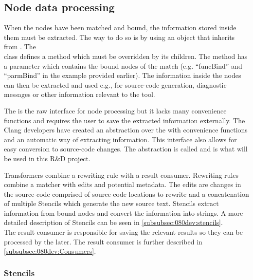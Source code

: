 \subsection{Node data processing} \label{subsec:080dev:NodeDataProcessing}

When the nodes have been matched and bound, the information stored inside them must be extracted. The way to do so is by using an object that inherits from .
The \\ class defines a  method which must be overridden by its children. The  method has a  parameter which contains the bound nodes of the match (e.g. ``funcBind'' and ``parmBind'' in the example provided earlier).
The information inside the nodes can then be extracted and used e.g., for source-code generation, diagnostic messages or other information relevant to the tool.

The  is the raw interface for node processing but it lacks many convenience functions and requires the user to save the extracted information externally. The Clang developers have created an abstraction over the  with convenience functions and an automatic way of extracting information. This interface also allows for easy conversion to source-code changes. The abstraction is called  and is what will be used in this R\&D project.

Transformers combine a rewriting rule with a result consumer. Rewriting rules combine a matcher with edits and potential metadata. The edits are changes in the source-code comprised of source-code locations to rewrite and a concatenation of multiple Stencils which generate the new source text. Stencils extract information from bound nodes and convert the information into strings. A more detailed description of Stencils can be seen in \cref{subsubsec:080dev:stencils}.\\
The result consumer is responsible for saving the relevant results so they can be processed by the  later. The result consumer is further described in \cref{subsubsec:080dev:Consumers}.

\subsubsection*{Stencils} \label{subsubsec:080dev:stencils}


